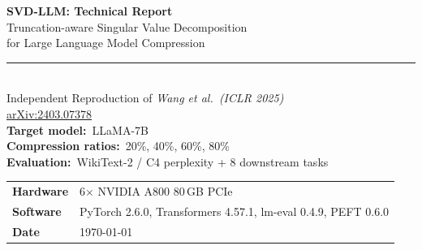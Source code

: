 \documentclass[11pt,a4paper]{article}
\theoremstyle{remark}
\begin{document}
\begin{titlepage}
  \centering
  \vspace*{3cm}
  {\LARGE\bfseries\color{mainblue}
    SVD-LLM: Technical Report\\[0.4em]
  }
  {\large Truncation-aware Singular Value Decomposition\\
    for Large Language Model Compression}\\[2em]
  \rule{0.6\textwidth}{0.8pt}\\[1.5em]
  {\normalsize
    Independent Reproduction of \textit{Wang et al.\ (ICLR 2025)}\\
    \href{https://arxiv.org/abs/2403.07378}{arXiv:2403.07378}
  }\\[3em]
  {\normalsize
    \textbf{Target model:}\ LLaMA-7B\\[0.4em]
    \textbf{Compression ratios:}\ 20\%, 40\%, 60\%, 80\%\\[0.4em]
    \textbf{Evaluation:}\ WikiText-2 / C4 perplexity + 8 downstream tasks
  }\\[2em]
  \vfill
  {\small\color{darkgray}
    \begin{tabular}{ll}
    \textbf{Hardware} & 6$\times$ NVIDIA A800 80\,GB PCIe \\
    \textbf{Software} & PyTorch 2.6.0, Transformers 4.57.1, lm-eval 0.4.9, PEFT 0.6.0 \\
    \textbf{Date} & \today \\
    \end{tabular}
  }
\end{titlepage}

\begin{abstract}
This report provides a self-contained description and independent reproduction
of \textbf{SVD-LLM} (Wang et al., ICLR 2025), a post-training low-rank
compression method for large language models.  SVD-LLM introduces two key
techniques: (1)~\emph{truncation-aware data whitening}, which transforms the
input activations so that truncating the smallest singular values of the
transformed weight matrix is provably optimal in the output-error sense; and
(2)~\emph{sequential low-rank approximation}, a two-stage LoRA fine-tuning
procedure that alternately updates the two factor matrices to recover accuracy
lost during truncation.  We reproduce the method from the paper alone---without
referencing the official codebase---and evaluate on LLaMA-7B at compression
ratios of 20\%, 40\%, 60\%, and 80\%.  The SVD-LLM(W) (whitening-only)
variant matches or outperforms the paper's reported perplexity at every ratio;
downstream accuracy on six classification benchmarks agrees within $\pm 0.05$.
We provide complete mathematical derivations, pseudocode, implementation
details, and a full notation reference.
\end{abstract}
\end{document}
